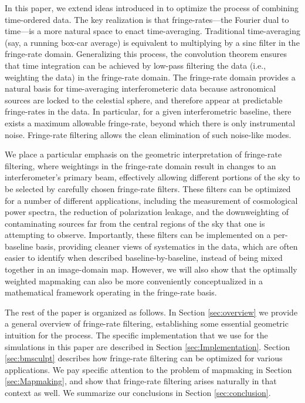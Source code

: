 \documentclass[twocolumn,apj,numberedappendix]{emulateapj}
\begin{document}
In this paper, we extend ideas introduced in \citet{parsons_backer2009} to optimize the process of combining time-ordered data. The key realization is that fringe-rates---the Fourier dual to time---is a
more natural space to enact time-averaging. Traditional time-averaging (say, a running box-car average)
is equivalent to multiplying by a sinc filter in the fringe-rate domain. Generalizing this process, the
convolution theorem ensures that time integration can be achieved by low-pass filtering the data (i.e.,
weighting the data) in the fringe-rate domain. The fringe-rate domain provides a natural basis for time-averaging interferometeric
data because astronomical sources are locked to the celestial sphere, and therefore appear at
predictable fringe-rates in the data. In particular, for a given interferometric baseline, there exists
a maximum allowable fringe-rate, beyond which there is only instrumental noise. Fringe-rate filtering
allows the clean elimination of such noise-like modes.

We place a particular emphasis on the geometric interpretation of fringe-rate filtering,
where weightings in the fringe-rate domain result in changes to an interferometer's primary beam,
effectively allowing different portions of the sky to be selected by carefully chosen fringe-rate filters.
These filters can be optimized for a number of different applications, including the measurement
of cosmological power spectra, the reduction of polarization leakage, and the downweighting of
contaminating sources far from the central regions of the sky that one is attempting to observe.
Importantly, these filters can be implemented on a per-baseline basis, providing cleaner views
of systematics in the data, which are often easier to identify when described baseline-by-baseline,
instead of being mixed together in an image-domain map. However, we will also show that the
optimally weighted mapmaking can also be more conveniently conceptualized in a mathematical
framework operating in the fringe-rate basis.

The rest of the paper is organized as follows. In Section \ref{sec:overview} we provide a general
overview of fringe-rate filtering, establishing some essential geometric intuition for the process. The
specific implementation that we use for the simulations in this paper are described in Section
\ref{sec:Implementation}. Section \ref{sec:bmsculpt} describes how fringe-rate filtering can be
optimized for various applications. We pay specific attention to the problem of mapmaking in
Section \ref{sec:Mapmaking}, and show that fringe-rate filtering arises naturally in that context as well.
We summarize our conclusions in Section \ref{sec:conclusion}.
\end{document}

